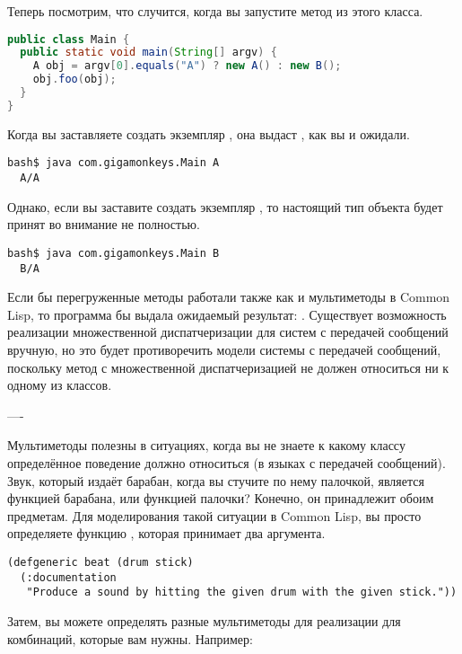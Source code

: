 Теперь посмотрим, что случится, когда вы запустите метод  из этого класса.

\begin{lstlisting}[language=java]
public class Main {
  public static void main(String[] argv) {
    A obj = argv[0].equals("A") ? new A() : new B();
    obj.foo(obj);
  }
}
\end{lstlisting}

Когда вы заставляете  создать экземпляр , она выдаст , как вы и
ожидали.

\begin{lstlisting}[style=lisprepl]
  bash$ java com.gigamonkeys.Main A
  A/A
\end{lstlisting}

Однако, если вы заставите  создать экземпляр , то настоящий тип объекта
 будет принят во внимание не полностью.

\begin{lstlisting}[style=lisprepl]
  bash$ java com.gigamonkeys.Main B
  B/A
\end{lstlisting}

Если бы перегруженные методы работали также как и мультиметоды в Common Lisp, то программа
бы выдала ожидаемый результат: .  Существует возможность реализации
множественной диспатчеризации для систем с передачей сообщений вручную, но это будет
противоречить модели системы с передачей сообщений, поскольку метод с множественной
диспатчеризацией не должен относиться ни к одному из классов.

----

Мультиметоды полезны в ситуациях, когда вы не знаете к какому классу определённое
поведение должно относиться (в языках с передачей сообщений).  Звук, который издаёт
барабан, когда вы стучите по нему палочкой, является функцией барабана, или функцией
палочки?  Конечно, он принадлежит обоим предметам.  Для моделирования такой ситуации в
Common Lisp, вы просто определяете функцию , которая принимает два аргумента.

\begin{lstlisting}
(defgeneric beat (drum stick)
  (:documentation
   "Produce a sound by hitting the given drum with the given stick."))
\end{lstlisting}

Затем, вы можете определять разные мультиметоды для реализации  для комбинаций,
которые вам нужны. Например:

